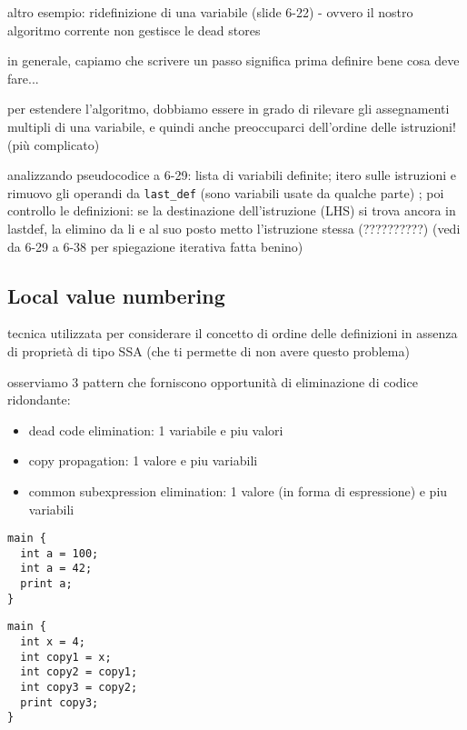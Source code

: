 \begin{example}
    altro esempio: ridefinizione di una variabile (slide 6-22) - ovvero il nostro algoritmo corrente non gestisce le dead stores

    \begin{emphasize}
      in generale, capiamo che scrivere un passo significa prima definire bene cosa deve fare...
    \end{emphasize}
    
    per estendere l'algoritmo, dobbiamo essere in grado di rilevare gli assegnamenti multipli di una variabile, e quindi anche preoccuparci dell'ordine delle istruzioni! (pi\`u complicato)

    analizzando pseudocodice a 6-29: lista di variabili definite; itero sulle istruzioni e rimuovo gli operandi da \lstinline|last_def| (sono variabili usate da qualche parte) ; poi controllo le definizioni: se la destinazione dell'istruzione (LHS) si trova ancora in lastdef, la elimino da li e al suo posto metto l'istruzione stessa (??????????) (vedi da 6-29 a 6-38 per spiegazione iterativa fatta benino)
\end{example}

\subsection{Local value numbering}

tecnica utilizzata per considerare il concetto di ordine delle definizioni in assenza di propriet\`a di tipo SSA (che ti permette di non avere questo problema)

osserviamo 3 pattern che forniscono opportunit\`a di eliminazione di codice ridondante:
\begin{itemize}
  \item dead code elimination: 1 variabile e piu valori
  \item copy propagation: 1 valore e piu variabili
  \item common subexpression elimination: 1 valore (in forma di espressione) e piu variabili
\end{itemize}

\begin{lstlisting}
main {
  int a = 100;
  int a = 42;
  print a;
}\end{lstlisting}

\begin{lstlisting}
main {
  int x = 4;
  int copy1 = x;
  int copy2 = copy1;
  int copy3 = copy2;
  print copy3;
}\end{lstlisting}

